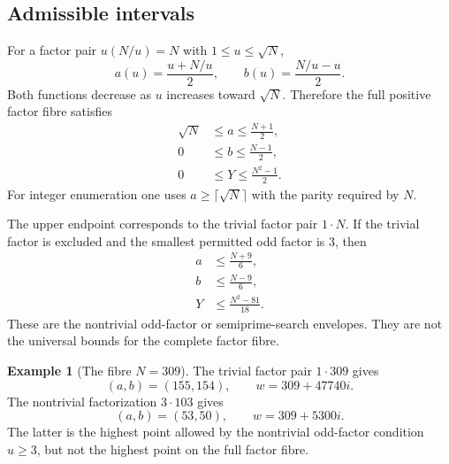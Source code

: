 \documentclass[11pt]{article}
\theoremstyle{definition}
\newtheorem{example}[theorem]{Example}
\theoremstyle{remark}
\newcommand{\1}{\mathbf{1}}
\begin{document}
\subsection{Admissible intervals}

For a factor pair $u(N/u)=N$ with $1\le u\le\sqrt N$,
\begin{equation}
 a(u)=\frac{u+N/u}{2},
 \qquad
 b(u)=\frac{N/u-u}{2}.
 \label{eq:ab-u}
\end{equation}
Both functions decrease as $u$ increases toward $\sqrt N$.  Therefore the full positive factor fibre satisfies
\begin{align}
 \sqrt N&\le a\le\frac{N+1}{2},
 \label{eq:a-full-range}\\
 0&\le b\le\frac{N-1}{2},
 \label{eq:b-full-range}\\
 0&\le Y\le\frac{N^2-1}{2}.
 \label{eq:Y-full-range}
\end{align}
For integer enumeration one uses $a\ge\lceil\sqrt N\rceil$ with the parity required by $N$.

The upper endpoint corresponds to the trivial factor pair $1\cdot N$.  If the trivial factor is excluded and the smallest permitted odd factor is $3$, then
\begin{align}
 a&\le\frac{N+9}{6},
 \label{eq:a-three}\\
 b&\le\frac{N-9}{6},
 \label{eq:b-three}\\
 Y&\le\frac{N^2-81}{18}.
 \label{eq:Y-three}
\end{align}
These are the nontrivial odd-factor or semiprime-search envelopes.  They are not the universal bounds for the complete factor fibre.

\begin{example}[The fibre $N=309$]
The trivial factor pair $1\cdot309$ gives
\[
 (a,b)=(155,154),
 \qquad
 w=309+47740i.
\]
The nontrivial factorization $3\cdot103$ gives
\[
 (a,b)=(53,50),
 \qquad
 w=309+5300i.
\]
The latter is the highest point allowed by the nontrivial odd-factor condition $u\ge3$, but not the highest point on the full factor fibre.
\end{example}
\end{document}
